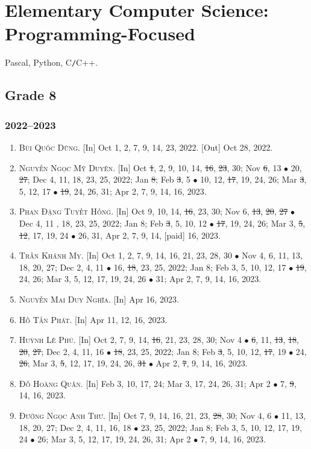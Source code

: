 \documentclass{article}
\begin{document}

\section{Elementary Computer Science: Programming-Focused}
Pascal, Python, C\texttt{/}C++.

\subsection{Grade 8}

\subsubsection{2022--2023}

\begin{enumerate}
	\item \textsc{Bùi Quốc Dũng.} \textsf{[In]} Oct 1, 2, 7, 9, 14, 23, 2022. \textsf{[Out]} Oct 28, 2022.
	\item \textsc{Nguyễn Ngọc Mỹ Duyên.} \textsf{[In]} Oct \st{1}, 2, 9, 10, 14, \st{16}, \st{23}, 30; Nov \st{6}, 13 $\bullet$ 20, \st{27}; Dec 4, 11, 18, 23, 25, 2022; Jan \st{8}; Feb \st{3}, 5 $\bullet$ 10, 12, \st{17}, 19, 24, 26; Mar \st{3}, 5, 12, 17 $\bullet$ \st{19}, 24, 26, 31; Apr 2, 7, 9, 14, 16, 2023.
	\item \textsc{Phan Đặng Tuyết Hồng.} \textsf{[In]} Oct 9, 10, 14, \st{16}, 23, 30; Nov 6, \st{13}, \st{20}, \st{27} $\bullet$ Dec 4, 11 , 18, 23, 25, 2022; Jan 8; Feb \st{3}, 5, 10, 12 $\bullet$ \st{17}, 19, 24, 26; Mar 3, \st{5}, \st{12}, 17, 19, 24 $\bullet$ 26, 31, Apr 2, 7, 9, 14, [paid] 16, 2023.
	\item \textsc{Trần Khánh My.} \textsf{[In]} Oct 1, 2, 7, 9, 14, 16, 21, 23, 28, 30 $\bullet$ Nov 4, 6, 11, 13, 18, 20, 27; Dec 2, 4, 11 $\bullet$ 16, \st{18}, 23, 25, 2022; Jan 8; Feb 3, 5, 10, 12, 17 $\bullet$ \st{19}, 24, 26; Mar 3, 5, 12, 17, 19, 24, 26 $\bullet$ 31; Apr 2, 7, 9, 14, 16, 2023.
	\item \textsc{Nguyễn Mai Duy Nghĩa.} \textsf{[In]} Apr 16, 2023.
	\item \textsc{Hồ Tấn Phát.} \textsf{[In]} Apr 11, 12, 16, 2023.
	\item \textsc{Huỳnh Lê Phú.} \textsf{[In]} Oct 2, 7, 9, 14, \st{16}, 21, 23, 28, 30; Nov 4 $\bullet$ \st{6}, 11, \st{13}, \st{18}, \st{20}, \st{27}; Dec 2, 4, 11, 16 $\bullet$ \st{18}, 23, 25, 2022; Jan 8; Feb \st{3}, 5, 10, 12, \st{17}, 19 $\bullet$ 24, \st{26}; Mar 3, \st{5}, 12, 17, 19, 24, 26, \st{31} $\bullet$ Apr 2, \st{7}, 9, 14, 16, 2023.
	\item \textsc{Đỗ Hoàng Quân.} \textsf{[In]} Feb 3, 10, 17, 24; Mar 3, 17, 24, 26, 31; Apr 2 $\bullet$ 7, \st{9}, 14, 16, 2023.
	\item \textsc{Đường Ngọc Anh Thư.} \textsf{[In]} Oct 7, 9, 14, 16, 21, 23, \st{28}, 30; Nov 4, 6 $\bullet$ 11, 13, 18, 20, 27; Dec 2, 4, 11, 16, 18 $\bullet$ 23, 25, 2022; Jan 8; Feb 3, 5, 10, 12, 17, 19, 24 $\bullet$ 26; Mar 3, 5, 12, 17, 19, 24, 26, 31; Apr 2 $\bullet$ 7, 9, 14, 16, 2023.
\end{enumerate}
\end{document}
